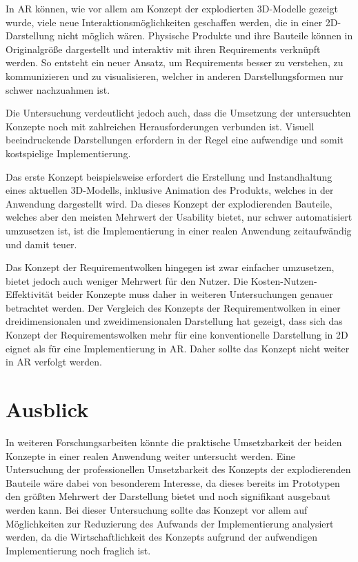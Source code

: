 In AR können, wie vor allem am Konzept der explodierten 3D-Modelle gezeigt wurde, viele neue Interaktionsmöglichkeiten geschaffen werden, die in einer 2D-Darstellung nicht möglich wären.
Physische Produkte und ihre Bauteile können in Originalgröße dargestellt und interaktiv mit ihren Requirements verknüpft werden.
So entsteht ein neuer Ansatz, um Requirements besser zu verstehen, zu kommunizieren und zu visualisieren, welcher in anderen Darstellungsformen nur schwer nachzuahmen ist.

Die Untersuchung verdeutlicht jedoch auch, dass die Umsetzung der untersuchten Konzepte noch mit zahlreichen Herausforderungen verbunden ist.
Visuell beeindruckende Darstellungen erfordern in der Regel eine aufwendige und somit kostspielige Implementierung.

Das erste Konzept beispielsweise erfordert die Erstellung und Instandhaltung eines aktuellen 3D-Modells, inklusive Animation des Produkts, welches in der Anwendung dargestellt wird.
Da dieses Konzept der explodierenden Bauteile, welches aber den meisten Mehrwert der Usability bietet, nur schwer automatisiert umzusetzen ist, ist die Implementierung in einer realen Anwendung zeitaufwändig und damit teuer.

Das Konzept der Requirementwolken hingegen ist zwar einfacher umzusetzen, bietet jedoch auch weniger Mehrwert für den Nutzer.
Die Kosten-Nutzen-Effektivität beider Konzepte muss daher in weiteren Untersuchungen genauer betrachtet werden. \newline
Der Vergleich des Konzepts der Requirementwolken in einer dreidimensionalen und zweidimensionalen Darstellung hat gezeigt, dass sich das Konzept der Requirementswolken mehr für eine konventionelle Darstellung in 2D eignet als für eine Implementierung in AR.
Daher sollte das Konzept nicht weiter in AR verfolgt werden.

\newpage

\section{Ausblick}
\label{section:ausblick}

In weiteren Forschungsarbeiten könnte die praktische Umsetzbarkeit der beiden Konzepte in einer realen Anwendung weiter untersucht werden.
Eine Untersuchung der professionellen Umsetzbarkeit des Konzepts der explodierenden Bauteile wäre dabei von besonderem Interesse, da dieses bereits im Prototypen den größten Mehrwert der Darstellung bietet und noch signifikant ausgebaut werden kann.
Bei dieser Untersuchung sollte das Konzept vor allem auf Möglichkeiten zur Reduzierung des Aufwands der Implementierung analysiert werden, da die Wirtschaftlichkeit des Konzepts aufgrund der aufwendigen Implementierung noch fraglich ist.


